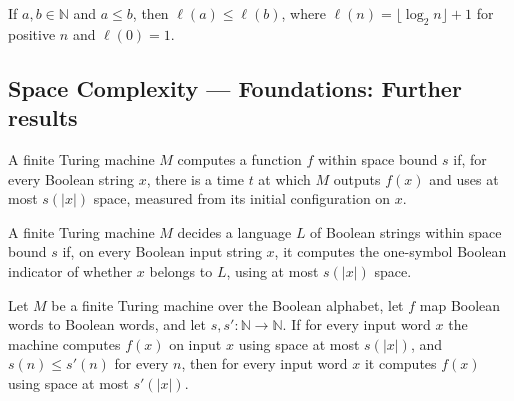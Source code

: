\begin{definition}
\label{Complexity.logSpace_mono}
\leanok
{}
If $a,b\in\mathbb{N}$ and $a\le b$, then $\ell(a)\le\ell(b)$, where
$\ell(n)=\lfloor\log_2 n\rfloor+1$ for positive $n$ and $\ell(0)=1$.
\end{definition}

\subsection*{Space Complexity --- Foundations: Further results}

\begin{definition}
\label{Turing.FinTM.ComputesInSpace}
\leanok
{}
A finite Turing machine $M$ computes a function $f$ within space bound $s$ if, for every
Boolean string $x$, there is a time $t$ at which $M$ outputs $f(x)$ and uses at most
$s(|x|)$ space, measured from its initial configuration on $x$.
\end{definition}

\begin{definition}
\label{Turing.FinTM.DecidesInSpace}
\leanok
{}
A finite Turing machine $M$ decides a language $L$ of Boolean strings within space bound
$s$ if, on every Boolean input string $x$, it computes the one-symbol Boolean indicator
of whether $x$ belongs to $L$, using at most $s(|x|)$ space.
\end{definition}

\begin{theorem}
\label{Turing.FinTM.ComputesInSpace.mono}
\leanok
{}
Let $M$ be a finite Turing machine over the Boolean alphabet, let $f$ map Boolean words
to Boolean words, and let $s,s' : \mathbb{N} \to \mathbb{N}$. If for every input word
$x$ the machine computes $f(x)$ on input $x$ using space at most $s(|x|)$, and $s(n) \le
s'(n)$ for every $n$, then for every input word $x$ it computes $f(x)$ using space at
most $s'(|x|)$.
\end{theorem}

